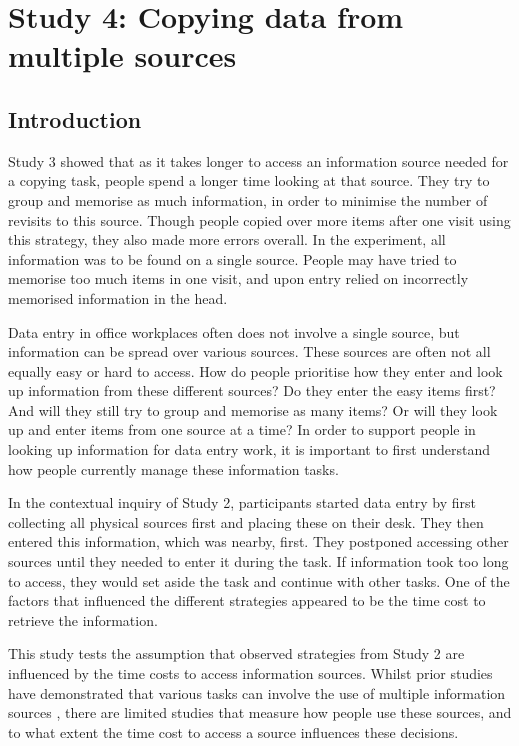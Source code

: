 \section{Study 4: Copying data from multiple sources}
 
\subsection{Introduction}
Study 3 showed that as it takes longer to access an information source needed for a copying task, people spend a longer time looking at that source. They try to group and memorise as much information, in order to minimise the number of revisits to this source. Though people copied over more items after one visit using this strategy, they also made more errors overall. In the experiment, all information was to be found on a single source. People may have tried to memorise too much items in one visit, and upon entry relied on incorrectly memorised information in the head.

Data entry in office workplaces often does not involve a single source, but information can be spread over various sources. These sources are often not all equally easy or hard to access. How do people prioritise how they enter and look up information from these different sources? Do they enter the easy items first? And will they still try to group and memorise as many items? Or will they look up and enter items from one source at a time? In order to support people in looking up information for data entry work, it is important to first understand how people currently manage these information tasks.

In the contextual inquiry of Study 2, participants started data entry by first collecting all physical sources first and placing these on their desk. They then entered this information, which was nearby, first. They postponed accessing other sources until they needed to enter it during the task. If information took too long to access, they would set aside the task and continue with other tasks. One of the factors that influenced the different strategies appeared to be the time cost to retrieve the information. 

This study tests the assumption that observed strategies from Study 2 are influenced by the time costs to access information sources. Whilst prior studies have demonstrated that various tasks can involve the use of multiple information sources \citep{Cangiano2009, Murphy2016, Su2013}, there are limited studies that measure how people use these sources, and to what extent the time cost to access a source influences these decisions.

